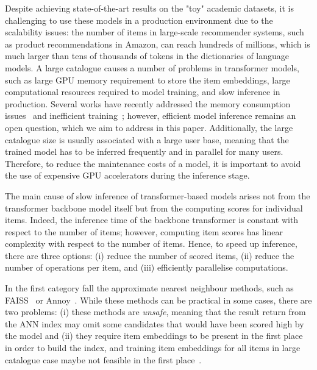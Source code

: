 \documentclass[sigconf,natbib=true, review=true]{acmart} %
\begin{document}
Despite achieving state-of-the-art results on the "toy" academic datasets, it is challenging to use these models in a production environment due to the scalability issues: the number of items in large-scale recommender systems, such as product recommendations in Amazon, can reach hundreds of millions, which is much larger than tens of thousands of tokens in the dictionaries of language models.  A large catalogue causes a number of problems in transformer models, such as large GPU memory requirement to store the item embeddings, large computational resources required to model training, and slow inference in production. Several works have recently addressed the memory consumption issues~\cite{xiaEfficientOnDeviceSessionBased2023, petrovRecJPQTrainingLargeCatalogue2024} and inefficient training~\cite{klenitskiyTurningDrossGold2023, petrovGSASRecReducingOverconfidence2023, petrovRSSEffectiveEfficient2023}; however, efficient model inference remains an open question, which we aim to address in this paper. Additionally, the large catalogue size is usually associated with a large user base, meaning that the trained model has to be inferred frequently and in parallel for many users. Therefore, to reduce the maintenance costs of a model, it is important to avoid the use of expensive GPU accelerators during the inference stage. 

The main cause of slow inference of transformer-based models arises not from the transformer backbone model itself but from the computing scores for individual items. Indeed, the inference time of the backbone transformer is constant with respect to the number of items; however, computing item scores has linear complexity with respect to the number of items. Hence, to speed up inference, there are three options: (i) reduce the number of scored items, (ii) reduce the number of operations per item, and (iii) efficiently parallelise computations. 


In the first category fall the approximate nearest neighbour methods, such as FAISS~\cite{FAISS} or Annoy~\cite{SpotifyAnnoy2024}. While these methods can be practical in some cases, there are two problems: (i) these methods are \emph{unsafe}, meaning that the result return from the ANN index may omit some candidates that would have been scored high by the model and (ii) they require item embeddings to be present in the first place in order to build the index, and training item embeddings for all items in large catalogue case maybe not feasible in the first place~\cite{petrovRecJPQTrainingLargeCatalogue2024}.
\end{document}

